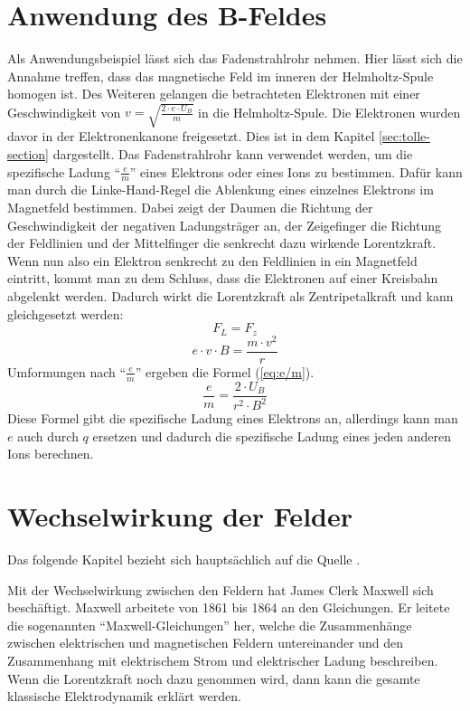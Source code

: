 \section{Anwendung des B-Feldes}
\label{sec:Fadenstrahlrohr}
Als Anwendungsbeispiel lässt sich das Fadenstrahlrohr nehmen.
Hier lässt sich die Annahme treffen, dass das magnetische Feld im inneren der Helmholtz-Spule homogen ist. Des Weiteren gelangen die betrachteten Elektronen mit einer Geschwindigkeit von $v=\sqrt{\frac{2 \cdot e \cdot U_B}{m}}$ in die Helmholtz-Spule.
Die Elektronen wurden davor in der Elektronenkanone freigesetzt.
Dies ist in dem Kapitel \ref{sec:tolle-section} dargestellt. 
Das Fadenstrahlrohr kann verwendet werden, um die spezifische Ladung "`$\frac{e}{m}$"' eines Elektrons oder eines Ions zu bestimmen.
Dafür kann man durch die Linke-Hand-Regel die Ablenkung eines einzelnes Elektrons im Magnetfeld bestimmen.
Dabei zeigt der Daumen die Richtung der Geschwindigkeit der negativen Ladungsträger an, der Zeigefinger die Richtung der Feldlinien und der Mittelfinger die senkrecht dazu wirkende Lorentzkraft.
Wenn nun also ein Elektron senkrecht zu den Feldlinien in ein Magnetfeld eintritt, kommt man zu dem Schluss, dass die Elektronen auf einer Kreisbahn abgelenkt werden. 
Dadurch wirkt die Lorentzkraft als Zentripetalkraft und kann gleichgesetzt werden:
$$F_L = F_z$$
$$e \cdot v \cdot B = \frac{m \cdot v^2}{r}$$
Umformungen nach "`$\frac{e}{m}$"' ergeben die Formel (\ref{eq:e/m}).
\begin{equation}
\label{eq:e/m}
    \frac{e}{m} = \frac{2 \cdot U_B}{ r^2 \cdot B^2}
\end{equation}
Diese Formel gibt die spezifische Ladung eines Elektrons an, allerdings kann man $e$ auch durch $q$ ersetzen und dadurch die spezifische Ladung eines jeden anderen Ions berechnen.
\section{Wechselwirkung der Felder}%
\label{sec:Maxwell}
Das folgende Kapitel bezieht sich hauptsächlich auf die Quelle \cite{Maxwell}.

Mit der Wechselwirkung zwischen den Feldern hat James Clerk Maxwell sich
beschäftigt.
Maxwell arbeitete von 1861 bis 1864 an den Gleichungen.
Er leitete die sogenannten "`Maxwell-Gleichungen"' her, welche die Zusammenhänge zwischen elektrischen und magnetischen Feldern untereinander und den Zusammenhang mit elektrischem Strom und elektrischer Ladung beschreiben.
Wenn die Lorentzkraft noch dazu genommen wird, dann kann die gesamte klassische Elektrodynamik erklärt werden.

